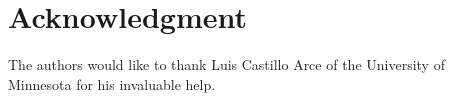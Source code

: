 \documentclass[conference]{IEEEtran}
\begin{document}


\section*{Acknowledgment}


The authors would like to thank Luis Castillo Arce of the University of Minnesota for his invaluable help.






\end{document}
